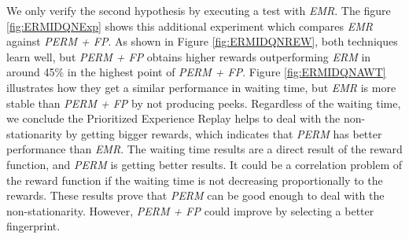 \documentclass{llncs}
\begin{document}
We only verify the second hypothesis by executing a test with \textit{EMR}. The figure \ref{fig:ERMIDQNExp} shows this additional experiment which compares \textit{EMR} against \textit{PERM + FP}. As shown in Figure \ref{fig:ERMIDQNREW}, both techniques learn well, but \textit{PERM + FP} obtains higher rewards outperforming \textit{ERM} in around 45$\%$ in the highest point of \textit{PERM + FP}. Figure \ref{fig:ERMIDQNAWT} illustrates how they get a similar performance in waiting time, but \textit{EMR} is  more stable than \textit{PERM + FP} by not producing peeks. Regardless of the waiting time, we conclude the Prioritized Experience Replay helps to deal with the non-stationarity by getting bigger rewards, which indicates that \textit{PERM} has better performance than \textit{EMR}. The waiting time results are a direct result of the reward function, and \textit{PERM} is getting better results. It could be a correlation problem of the reward function if the waiting time is not decreasing proportionally to the rewards. These results prove that \textit{PERM} can be good enough to deal with the non-stationarity. However, \textit{PERM + FP} could improve by selecting a better fingerprint.
\end{document}
